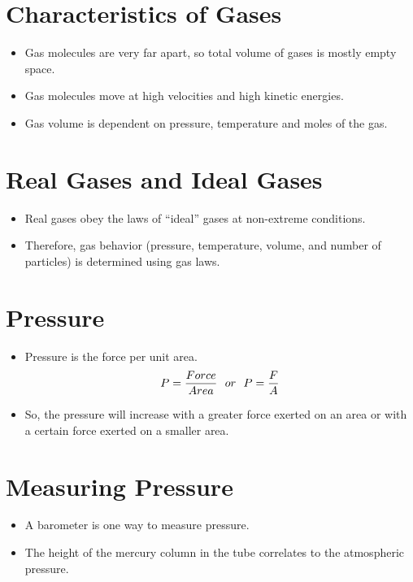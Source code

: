 \documentclass[
	chapter=5,
	title={Gases},
	showanswers=true,
]{chem122notes}
\begin{document}
\section{Characteristics of Gases}\label{sec:characteristics-of-gases}
\begin{itemize}
	\item Gas molecules are very far apart, so total volume of gases is mostly empty space.
	\item Gas molecules move at high velocities and high kinetic energies.
	\item Gas volume is dependent on pressure, temperature and moles of the gas.
\end{itemize}

\section{Real Gases and Ideal Gases}\label{sec:real-gases-and-ideal-gases}
\begin{itemize}
	\item Real gases obey the laws of ``ideal'' gases at non-extreme conditions.
	\item Therefore, gas behavior (pressure, temperature, volume, and number of particles) is determined using gas laws.
\end{itemize}

\section{Pressure}\label{sec:pressure}
\begin{itemize}
	\item Pressure is the force per unit area.
	\begin{equation}
		P = \frac{Force}{Area} \ \ or\ \ P = \frac{F}{A}\\
		\label{eq:pressure}
	\end{equation}
	\item So, the pressure will increase with a greater force exerted on an area or with a certain force exerted on a smaller area.
\end{itemize}

\section{Measuring Pressure}\label{sec:measuring-pressure}
\begin{minipage}[m]{0.7\textwidth}
	\begin{itemize}
		\item A barometer is one way to measure pressure.
		\item The height of the mercury column in the tube correlates to the atmospheric pressure.
	\end{itemize}
\end{minipage}\hfill%
\begin{minipage}[m]{0.3\textwidth}
\end{minipage}
\end{document}

